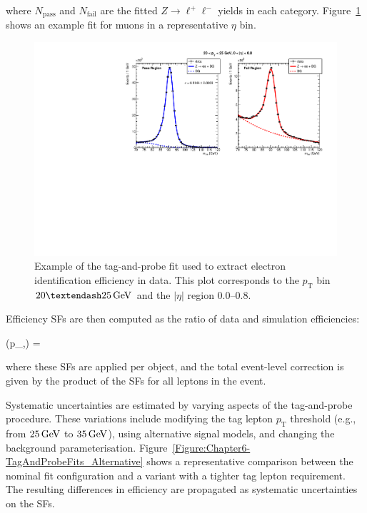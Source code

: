 where $N_{\text{pass}}$ and $N_{\text{fail}}$ are the fitted $Z \rightarrow \ell^+\ell^-$ yields in each category. Figure~\ref{Figure:Chapter6-TagAndProbeFits_Nominal} shows an example fit for muons in a representative $\eta$ bin.

\begin{figure}[!htbp]
\centering
\includegraphics[width=\textwidth]{Figures/Chapter6/data_id_pt_20_to_25_eta_0.0_to_0.8_tpzee_nominal.pdf}
\caption{Example of the tag-and-probe fit used to extract electron identification efficiency in data. This plot corresponds to the $p_{\mathrm{T}}$ bin $20–25\GeV$ and the $|\eta|$ region 0.0–0.8.}
\label{Figure:Chapter6-TagAndProbeFits_Nominal}
\end{figure}

Efficiency SFs are then computed as the ratio of data and simulation efficiencies:

\begin{equation_pad}
    (p_,\eta) = 
\end{equation_pad}

where these SFs are applied per object, and the total event-level correction is given by the product of the SFs for all leptons in the event.

Systematic uncertainties are estimated by varying aspects of the tag-and-probe procedure. These variations include modifying the tag lepton $p_{\text{T}}$ threshold (e.g., from $25\,\text{Ge\hspace{-.08em}V}$ to $35\,\text{Ge\hspace{-.08em}V}$), using alternative signal models, and changing the background parameterisation. Figure~\ref{Figure:Chapter6-TagAndProbeFits_Alternative} shows a representative comparison between the nominal fit configuration and a variant with a tighter tag lepton requirement. The resulting differences in efficiency are propagated as systematic uncertainties on the SFs.


